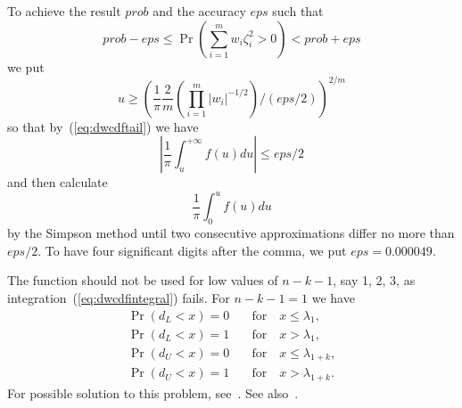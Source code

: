 To achieve the result $\mathit{prob}$ and the accuracy $\mathit{eps}$
such that
\begin{equation} \label{eq:dwcdfprob}
  \mathit{prob} - \mathit{eps} \leq \Pr \left( \sum_{i = 1}^m w_i
  \zeta_i^2 > 0 \right) < \mathit{prob} + \mathit{eps}
\end{equation}
we put
\begin{equation} \label{eq:dwcdfupperlimit}
  u \geq (\frac{1}{\pi} \frac{2}{m} (\prod_{i = 1}^m |w_i|^{-1 / 2}) /
  (\mathit{eps} / 2))^{2 / m}
\end{equation}
so that by~(\ref{eq:dwcdftail}) we have \[ |\frac{1}{\pi}
\int_u^{+\infty} f(u) du| \leq \mathit{eps} / 2 \] and then calculate
\begin{equation} \label{eq:dwcdfintegral}
  \frac{1}{\pi} \int_0^u f(u) du
\end{equation}
by the Simpson method until two consecutive approximations differ no
more than $\mathit{eps} / 2$. To have four significant digits after the
comma, we put $\mathit{eps} = 0.000049$.

The function should not be used for low values of $n - k - 1$, say 1, 2,
3, as integration~(\ref{eq:dwcdfintegral}) fails. For $n - k - 1 = 1$ we
have
\begin{align*}
  \Pr(d_L < x) = 0 & \quad \mathrm{for} \quad x \leq \lambda_1, \\
  \Pr(d_L < x) = 1 & \quad \mathrm{for} \quad x > \lambda_1, \\
  \Pr(d_U < x) = 0 & \quad \mathrm{for} \quad x \leq \lambda_{1 + k}, \\
  \Pr(d_U < x) = 1 & \quad \mathrm{for} \quad x > \lambda_{1 + k}.
\end{align*}
For possible solution to this problem, see~\cite{farebrother-1984}. See
also~\cite{savin-white-1977}.
